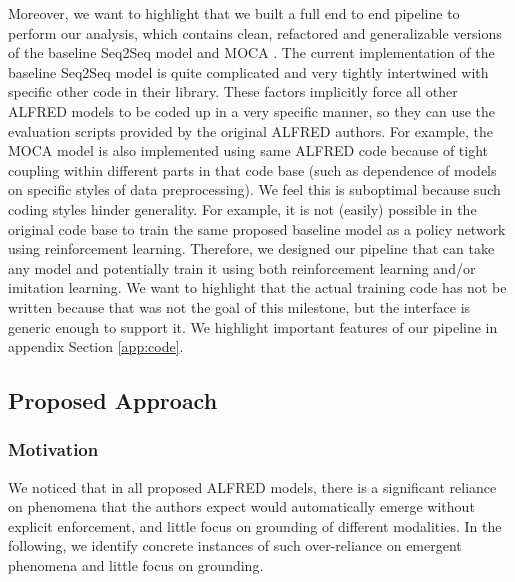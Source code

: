 \documentclass[11pt,a4paper]{article}
\begin{document}
Moreover, we want to highlight that we built a full end to end pipeline to perform our analysis, which contains clean, refactored and generalizable  versions of the baseline Seq2Seq model \cite{shridhar2020alfred} and MOCA \cite{singh2020moca}. The current implementation of the baseline Seq2Seq model \cite{shridhar2020alfred} is quite complicated and very tightly intertwined with specific other code in their library. These factors implicitly force all other ALFRED models to be coded up in a very specific manner, so they can use the evaluation scripts provided by the original ALFRED authors. For example, the MOCA model is also implemented using same ALFRED code because of tight coupling within different parts in that code base (such as dependence of models on specific styles of data preprocessing).  We feel this is suboptimal because such coding styles hinder generality. For example, it is not (easily) possible in the original code base to train the same proposed baseline model as a policy network using reinforcement learning. Therefore, we designed our pipeline that can take any model and potentially train it using both reinforcement learning and/or imitation learning. We want to highlight that the actual training code has not be written because that was not the goal of this milestone, but the interface is generic enough to support it. We highlight important features of our pipeline in appendix Section \ref{app:code}.

\subsection{Proposed Approach}

\subsubsection{Motivation}
\label{ssec:motiv}

We noticed that in all proposed ALFRED models, there is a significant reliance on phenomena that the authors expect would automatically emerge without explicit enforcement, and little focus on grounding of different modalities. In the following, we identify concrete instances of such over-reliance on emergent phenomena and little focus on grounding.
\end{document}
